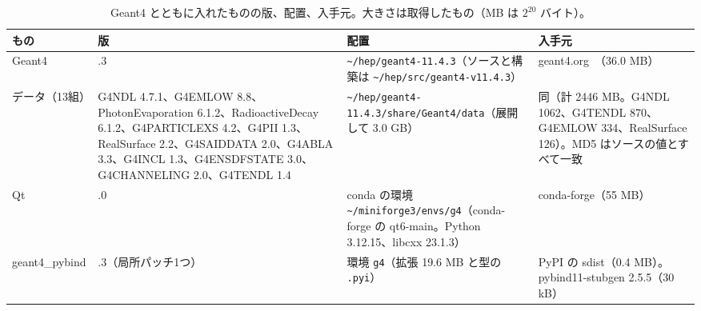 \documentclass[a4paper,10pt]{ltjsarticle}
\newcommand{\pth}[1]{\texttt{\textasciitilde/}\nolinkurl{#1}}
\begin{document}
\begin{table}[htbp]
\centering\small
\caption{Geant4 とともに入れたものの版、配置、入手元。大きさは取得したもの（MB は $2^{20}$ バイト）。}
\label{tab:g4}
\begin{tabularx}{\linewidth}{>{\raggedright\arraybackslash}p{2.1cm}>{\raggedright\arraybackslash}X>{\raggedright\arraybackslash}p{4.4cm}>{\raggedright\arraybackslash}p{3.9cm}}
\toprule
\textbf{もの} & \textbf{版} & \textbf{配置} & \textbf{入手元} \\
\midrule
Geant4 & 11.4.3 & \pth{hep/geant4-11.4.3}（ソースと構築は \pth{hep/src/geant4-v11.4.3}） & geant4.org~\cite{url:geant4}（36.0 MB） \\
データ（13組） & G4NDL 4.7.1、G4EMLOW 8.8、PhotonEvaporation 6.1.2、RadioactiveDecay 6.1.2、G4PARTICLEXS 4.2、G4PII 1.3、RealSurface 2.2、G4SAIDDATA 2.0、G4ABLA 3.3、G4INCL 1.3、G4ENSDFSTATE 3.0、G4CHANNELING 2.0、G4TENDL 1.4~\cite{tendl} & \pth{hep/geant4-11.4.3/share/Geant4/data}（展開して 3.0 GB） & 同（計 2446 MB。G4NDL 1062、G4TENDL 870、G4EMLOW 334、RealSurface 126）。MD5 はソースの値とすべて一致 \\
Qt & 6.12.0 & conda の環境 \pth{miniforge3/envs/g4}（conda-forge の qt6-main。Python 3.12.15、libcxx 23.1.3） & conda-forge（55 MB） \\
geant4\_pybind & 0.1.3（局所パッチ1つ） & 環境 \texttt{g4}（拡張 19.6 MB と型の \texttt{.pyi}） & PyPI の sdist（0.4 MB）。pybind11-stubgen 2.5.5（30 kB） \\
\bottomrule
\end{tabularx}
\end{table}
\end{document}

